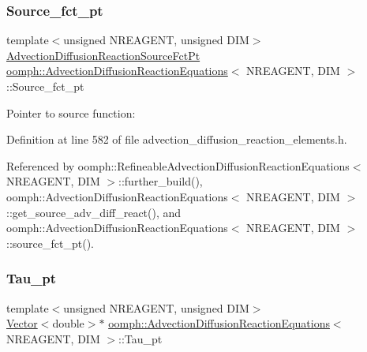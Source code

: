 \mbox{\label{classoomph_1_1AdvectionDiffusionReactionEquations_a1a79762a4b988e4feda96a5a8678c9ce}} 
\subsubsection{\texorpdfstring{Source\+\_\+fct\+\_\+pt}{Source\_fct\_pt}}
{\footnotesize\ttfamily template$<$unsigned N\+R\+E\+A\+G\+E\+NT, unsigned D\+IM$>$ \\
\hyperlink{classoomph_1_1AdvectionDiffusionReactionEquations_a3443e579e62414ecc50595403982e686}{Advection\+Diffusion\+Reaction\+Source\+Fct\+Pt} \hyperlink{classoomph_1_1AdvectionDiffusionReactionEquations}{oomph\+::\+Advection\+Diffusion\+Reaction\+Equations}$<$ N\+R\+E\+A\+G\+E\+NT, D\+IM $>$\+::Source\+\_\+fct\+\_\+pt\hspace{0.3cm}{\ttfamily [protected]}}



Pointer to source function\+: 



Definition at line 582 of file advection\+\_\+diffusion\+\_\+reaction\+\_\+elements.\+h.



Referenced by oomph\+::\+Refineable\+Advection\+Diffusion\+Reaction\+Equations$<$ N\+R\+E\+A\+G\+E\+N\+T, D\+I\+M $>$\+::further\+\_\+build(), oomph\+::\+Advection\+Diffusion\+Reaction\+Equations$<$ N\+R\+E\+A\+G\+E\+N\+T, D\+I\+M $>$\+::get\+\_\+source\+\_\+adv\+\_\+diff\+\_\+react(), and oomph\+::\+Advection\+Diffusion\+Reaction\+Equations$<$ N\+R\+E\+A\+G\+E\+N\+T, D\+I\+M $>$\+::source\+\_\+fct\+\_\+pt().

\mbox{\label{classoomph_1_1AdvectionDiffusionReactionEquations_a50ac4110c6bf38ada794fd25cb88431b}} 
\subsubsection{\texorpdfstring{Tau\+\_\+pt}{Tau\_pt}}
{\footnotesize\ttfamily template$<$unsigned N\+R\+E\+A\+G\+E\+NT, unsigned D\+IM$>$ \\
\hyperlink{classoomph_1_1Vector}{Vector}$<$double$>$$\ast$ \hyperlink{classoomph_1_1AdvectionDiffusionReactionEquations}{oomph\+::\+Advection\+Diffusion\+Reaction\+Equations}$<$ N\+R\+E\+A\+G\+E\+NT, D\+IM $>$\+::Tau\+\_\+pt\hspace{0.3cm}{\ttfamily [protected]}}



